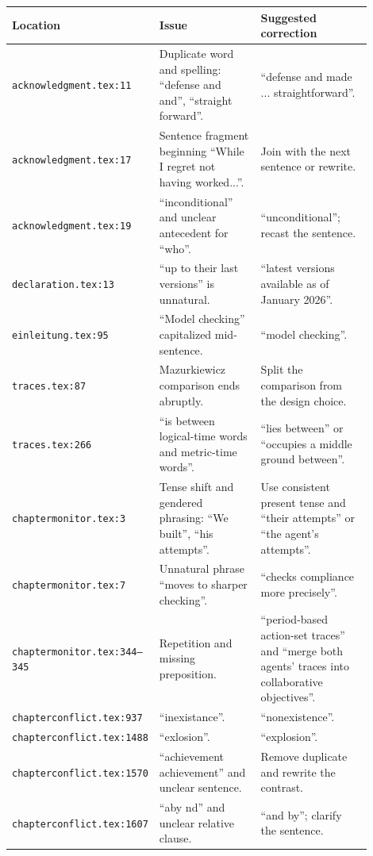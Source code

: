 \documentclass[11pt,a4paper]{article}
\newcommand{\loc}[1]{\texttt{#1}}
\begin{document}
\begin{longtable}{>{\raggedright\arraybackslash}p{0.25\linewidth}
                  >{\raggedright\arraybackslash}p{0.31\linewidth}
                  >{\raggedright\arraybackslash}p{0.34\linewidth}}
\textbf{Location} & \textbf{Issue} & \textbf{Suggested correction} \\
\hline
\loc{acknowledgment.tex:11} & Duplicate word and spelling: ``defense and and'', ``straight forward''. & ``defense and made ... straightforward''. \\
\loc{acknowledgment.tex:17} & Sentence fragment beginning ``While I regret not having worked...''. & Join with the next sentence or rewrite. \\
\loc{acknowledgment.tex:19} & ``inconditional'' and unclear antecedent for ``who''. & ``unconditional''; recast the sentence. \\
\loc{declaration.tex:13} & ``up to their last versions'' is unnatural. & ``latest versions available as of January 2026''. \\
\loc{einleitung.tex:95} & ``Model checking'' capitalized mid-sentence. & ``model checking''. \\
\loc{traces.tex:87} & Mazurkiewicz comparison ends abruptly. & Split the comparison from the design choice. \\
\loc{traces.tex:266} & ``is between logical-time words and metric-time words''. & ``lies between'' or ``occupies a middle ground between''. \\
\loc{chaptermonitor.tex:3} & Tense shift and gendered phrasing: ``We built'', ``his attempts''. & Use consistent present tense and ``their attempts'' or ``the agent's attempts''. \\
\loc{chaptermonitor.tex:7} & Unnatural phrase ``moves to sharper checking''. & ``checks compliance more precisely''. \\
\loc{chaptermonitor.tex:344--345} & Repetition and missing preposition. & ``period-based action-set traces'' and ``merge both agents' traces into collaborative objectives''. \\
\loc{chapterconflict.tex:937} & ``inexistance''. & ``nonexistence''. \\
\loc{chapterconflict.tex:1488} & ``exlosion''. & ``explosion''. \\
\loc{chapterconflict.tex:1570} & ``achievement achievement'' and unclear sentence. & Remove duplicate and rewrite the contrast. \\
\loc{chapterconflict.tex:1607} & ``aby nd'' and unclear relative clause. & ``and by''; clarify the sentence. \\

\end{longtable}
\end{document}
